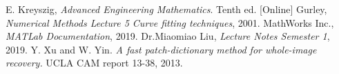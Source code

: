 \documentclass[a4paper]{article}
\begin{document}
\begin{thebibliography}{9}
  E. Kreyszig,
  \emph{Advanced Engineering Mathematics}.
   Tenth ed. [Online]
  Gurley,
  \emph{Numerical Methods Lecture 5 Curve fitting techniques},
   2001.
  MathWorks Inc.,
  \emph{MATLab Documentation},
   2019.
  Dr.Miaomiao Liu,
  \emph{Lecture Notes Semester 1},
   2019.
Y. Xu and W. Yin. \emph{A fast patch-dictionary method for whole-image recovery.} UCLA CAM report 13-38, 2013.
\end{thebibliography}
\end{document}
